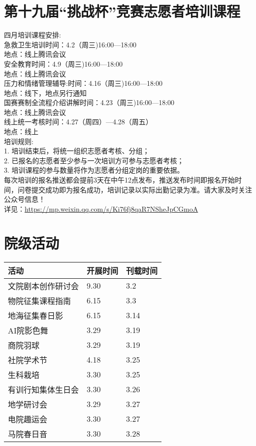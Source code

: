 \documentclass[letterpaper, 12pt]{article}
\begin{document}
\begin{multicols}{2}
\section{第十九届“挑战杯”竞赛志愿者培训课程}
四月培训课程安排:
\\急救卫生培训时间：4.2（周三)16:00—18:00
\\地点：线上腾讯会议
\\安全教育时间：4.9（周三)16:00—18:00
\\地点：线上腾讯会议
\\压力和情绪管理辅导:时间：4.16（周三)16:00—18:00
\\地点：线下，地点另行通知
\\国赛赛制全流程介绍讲解时间：4.23（周三)16:00—18:00
\\地点：线上腾讯会议
\\线上统一考核时间：4.27（周四）—4.28（周五）
\\地点：线上
\\培训规则:
\\1. 培训结束后，将统一组织志愿者考核、分组；
\\2. 已报名的志愿者至少参与一次培训方可参与志愿者考核；
\\3. 培训课程的参与数量将作为志愿者分组定岗的重要依据。
\\每次培训的报名推送都会提前3天在中午12点发布，推送发布时间即报名开始时间，问卷提交成功即为报名成功，培训记录以实际出勤记录为准。请大家及时关注公众号信息！
\\详见：\url{https://mp.weixin.qq.com/s/Ki76fj8qaR7NSheJpCGmoA}

\section{院级活动}
\begin{tabular}{|>{\centering\arraybackslash}m{}|m{}|m{}|}
\hline
    活动 & 开展时间 & 刊载时间\\
    \hline\hline
    文院剧本创作研讨会 & 9.30 & 3.2\\
    物院征集课程指南 & 6.15 & 3.3\\
    地海征集春日影 & 6.15 & 3.14\\
    AI院影色舞 & 3.29 & 3.19\\
    商院羽球 & 3.29 & 3.19\\
    社院学术节 & 4.18 & 3.25\\
    生科栽培 & 3.30 & 3.25\\
    有训行知集体生日会 & 3.30 & 3.26\\
    地学研讨会 & 3.29 & 3.27\\
    电院趣运会 & 3.30 & 3.27\\
    马院春日音 & 3.30 & 3.28\\
    

\end{tabular}
\end{multicols}
\end{document}
